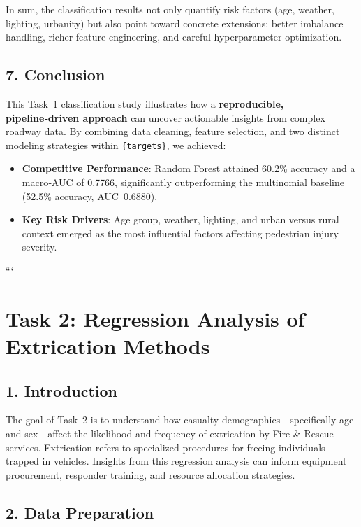 \documentclass[
]{article}
\providecommand{\tightlist}{%
  \setlength{\itemsep}{0pt}\setlength{\parskip}{0pt}}
\begin{document}
In sum, the classification results not only quantify risk factors (age,
weather, lighting, urbanity) but also point toward concrete extensions:
better imbalance handling, richer feature engineering, and careful
hyperparameter optimization.

\subsection{7. Conclusion}\label{conclusion}

This Task~1 classification study illustrates how a \textbf{reproducible,
pipeline‑driven approach} can uncover actionable insights from complex
roadway data. By combining data cleaning, feature selection, and two
distinct modeling strategies within \texttt{\{targets\}}, we achieved:

\begin{itemize}
\tightlist
\item
  \textbf{Competitive Performance}: Random Forest attained 60.2\%
  accuracy and a macro‐AUC of 0.7766, significantly outperforming the
  multinomial baseline (52.5\% accuracy, AUC~0.6880).
\item
  \textbf{Key Risk Drivers}: Age group, weather, lighting, and urban
  versus rural context emerged as the most influential factors affecting
  pedestrian injury severity.
\end{itemize}

```

\section{Task 2: Regression Analysis of Extrication
Methods}\label{task-2-regression-analysis-of-extrication-methods}

\subsection{1. Introduction}\label{introduction-1}

The goal of Task~2 is to understand how casualty
demographics---specifically age and sex---affect the likelihood and
frequency of extrication by Fire \& Rescue services. Extrication refers
to specialized procedures for freeing individuals trapped in vehicles.
Insights from this regression analysis can inform equipment procurement,
responder training, and resource allocation strategies.

\subsection{2. Data Preparation}\label{data-preparation}
\end{document}
